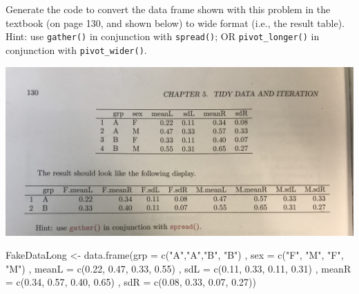 \documentclass[
]{article}
\newenvironment{Shaded}{\begin{snugshade}}{\end{snugshade}}
\newcommand{\AttributeTok}[1]{\textcolor[rgb]{0.77,0.63,0.00}{#1}}
\newcommand{\FloatTok}[1]{\textcolor[rgb]{0.00,0.00,0.81}{#1}}
\newcommand{\FunctionTok}[1]{\textcolor[rgb]{0.00,0.00,0.00}{#1}}
\newcommand{\NormalTok}[1]{#1}
\newcommand{\OtherTok}[1]{\textcolor[rgb]{0.56,0.35,0.01}{#1}}
\newcommand{\StringTok}[1]{\textcolor[rgb]{0.31,0.60,0.02}{#1}}
\begin{document}
Generate the code to convert the data frame shown with this problem in
the textbook (on page 130, and shown below) to wide format (i.e., the
result table). Hint: use \texttt{gather()} in conjunction with
\texttt{spread()}; OR \texttt{pivot\_longer()} in conjunction with
\texttt{pivot\_wider()}.

\includegraphics{images/mdsr_ex_5_7.jpg}

\begin{Shaded}
\begin{Highlighting}[]
\NormalTok{FakeDataLong }\OtherTok{\textless{}{-}} \FunctionTok{data.frame}\NormalTok{(}\AttributeTok{grp =} \FunctionTok{c}\NormalTok{(}\StringTok{"A"}\NormalTok{,}\StringTok{"A"}\NormalTok{,}\StringTok{"B"}\NormalTok{, }\StringTok{"B"}\NormalTok{)}
\NormalTok{                           , }\AttributeTok{sex =} \FunctionTok{c}\NormalTok{(}\StringTok{"F"}\NormalTok{, }\StringTok{"M"}\NormalTok{, }\StringTok{"F"}\NormalTok{, }\StringTok{"M"}\NormalTok{)}
\NormalTok{                           , }\AttributeTok{meanL =} \FunctionTok{c}\NormalTok{(}\FloatTok{0.22}\NormalTok{, }\FloatTok{0.47}\NormalTok{, }\FloatTok{0.33}\NormalTok{, }\FloatTok{0.55}\NormalTok{)}
\NormalTok{                           , }\AttributeTok{sdL =} \FunctionTok{c}\NormalTok{(}\FloatTok{0.11}\NormalTok{, }\FloatTok{0.33}\NormalTok{, }\FloatTok{0.11}\NormalTok{, }\FloatTok{0.31}\NormalTok{)}
\NormalTok{                           , }\AttributeTok{meanR =} \FunctionTok{c}\NormalTok{(}\FloatTok{0.34}\NormalTok{, }\FloatTok{0.57}\NormalTok{, }\FloatTok{0.40}\NormalTok{, }\FloatTok{0.65}\NormalTok{)}
\NormalTok{                           , }\AttributeTok{sdR =} \FunctionTok{c}\NormalTok{(}\FloatTok{0.08}\NormalTok{, }\FloatTok{0.33}\NormalTok{, }\FloatTok{0.07}\NormalTok{, }\FloatTok{0.27}\NormalTok{))}
\end{Highlighting}
\end{Shaded}
\end{document}
